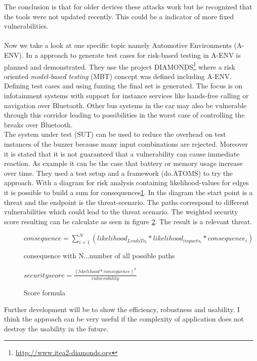 \documentclass[12pt,a4paper]{article}
\begin{document}
The conclusion is that for older devices these attacks work but he recognized that the tools were not updated recently. This could be a indicator of more fixed vulnerabilities.\\
\\
Now we take a look at one specific topic namely Automotive Environments (A-ENV). In \cite{DBLP:conf/automotiveSS/JakobKSGMSF12} a approach to generate test cases for risk-based testing in A-ENV is planned and demonstrated. They use the project DIAMONDS\footnote{\url{http://www.itea2-diamonds.org}} where a risk oriented \emph{model-based testing} (MBT) concept was defined including A-ENV. Defining test cases and using fuzzing the final set is generated. The focus is on infotainment systems with support for instance services like hands-free calling or navigation over Bluetooth. Other bus systems in the car may also be vulnerable through this corridor leading to possibilities in the worst case of controlling the breaks over Bluetooth. \\
The system under test (SUT) can be used to reduce the overhead on test instances of the buzzer because many input combinations are rejected. Moreover it is stated that it is not guaranteed that a vulnerability can cause immediate reaction. As example it can be the case that battery or memory usage increase over time. They used a test setup and a framework (do.ATOMS) to try the approach. With a diagram for risk analysis containing likelihood-values for edges it is possible to build a sum for consequences\ref{consequences_formula}. In the diagram the start point is a threat and the endpoint is the threat-scenario. The paths correspond to different vulnerabilities which could lead to the threat scenario. 
The weighted security score resulting can be calculate as seen in figure \ref{security_formula}. The result is a relevant threat.

\begin{figure}[h]
\begin{center}
	\begin{math}
	consequence = \sum_{i=1}^{N} (likelihood_{LeadsTo_i} * likelihood_{impacts_i} * consequence_i)
	\end{math}
	\caption{consequence with N...number of all possible paths \cite{DBLP:conf/automotiveSS/JakobKSGMSF12} }
\label{consequences_formula}
\end{center}
\end{figure}

\begin{figure}[h]
\begin{center}
\begin{math}
	security score = \frac{(likelihood * consequence)^2}{vulnerability}
\end{math}
\caption{Score formula \cite{DBLP:conf/automotiveSS/JakobKSGMSF12}}
\label{security_formula}
\end{center}
\end{figure}
Further development will be to show the efficiency, robustness and usability.
I think the approach can be very useful if the complexity of application does not destroy the usability in the future.\\
\end{document}
